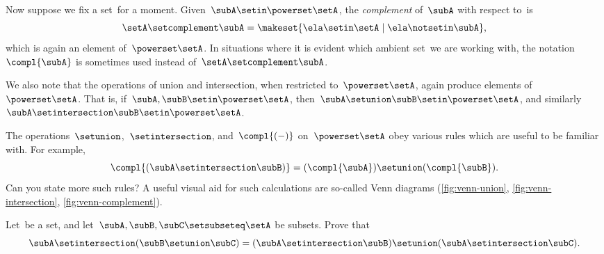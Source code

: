 Now suppose we fix a set~\setA for a moment.
Given~$\subA \setin\powerset \setA$, the \emph{complement} of~$\subA$ with respect to~\setA is
\begin{equation}
    \setA \setcomplement \subA = \makeset{ \ela \setin\setA \mid \ela \notsetin \subA },
\end{equation}
which is again an element of~$\powerset \setA$.
In situations where it is evident which ambient set~\setA we are working with, the notation~$\compl{\subA}$ is sometimes used instead of~$\setA \setcomplement \subA$.

We also note that the operations of union and intersection, when restricted to~$\powerset \setA$, again produce elements of~$\powerset \setA$.
That is, if~$\subA, \subB \setin\powerset \setA$, then~$\subA \setunion \subB \setin\powerset \setA$, and similarly~$\subA \setintersection \subB \setin\powerset \setA$.

The operations~$\setunion$,~$\setintersection$, and~$\compl{( - )}$ on~$\powerset \setA$ obey various rules which are useful to be familiar with.
For example,
\begin{equation}
    \compl{(\subA \setintersection \subB)} = (\compl{\subA}) \setunion (\compl{\subB}).
\end{equation}
Can you state more such rules?
A useful visual aid for such calculations are so-called Venn diagrams (\cref{fig:venn-union}, \cref{fig:venn-intersection}, \cref{fig:venn-complement}).

\begin{marginfigure}
    \centering
    \caption{Venn diagram for union operation.}
    \label{fig:venn-union}
\end{marginfigure}

\begin{marginfigure}
    \centering
    \caption{Venn diagram for intersection operation.}
    \label{fig:venn-intersection}
\end{marginfigure}

\begin{marginfigure}
    \centering
    \caption{Venn diagram for complement operation.}
    \label{fig:venn-complement}
\end{marginfigure}

\begin{gradedexercise}
    \label{ex:distributing-subsets}
    Let~\setA be a set, and let~$\subA, \subB, \subC \setsubseteq \setA$ be subsets.
    Prove that
    \begin{equation}
        \subA \setintersection (\subB \setunion \subC) = (\subA \setintersection \subB) \setunion (\subA \setintersection \subC).
    \end{equation}
\end{gradedexercise}

